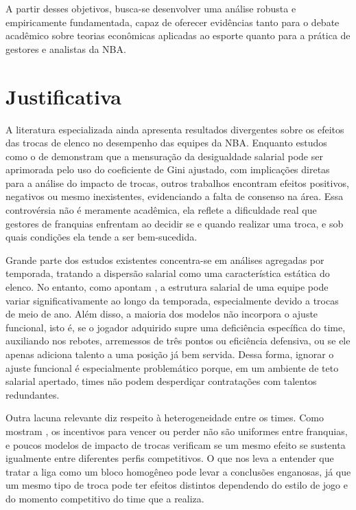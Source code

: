 A partir desses objetivos, busca-se desenvolver uma análise robusta e empiricamente fundamentada, capaz de oferecer evidências tanto para o debate acadêmico sobre teorias econômicas aplicadas ao esporte quanto para a prática de gestores e analistas da NBA.

\section{Justificativa}
A literatura especializada ainda apresenta resultados divergentes sobre os efeitos das trocas de elenco no desempenho das equipes da NBA. Enquanto estudos como o de \citet{larsen2006} demonstram que a mensuração da desigualdade salarial pode ser aprimorada pelo uso do coeficiente de Gini ajustado, com implicações diretas para a análise do impacto de trocas, outros trabalhos encontram efeitos positivos, negativos ou mesmo inexistentes, evidenciando a falta de consenso na área. Essa controvérsia não é meramente acadêmica, ela reflete a dificuldade real que gestores de franquias enfrentam ao decidir se e quando realizar uma troca, e sob quais condições ela tende a ser bem-sucedida.

Grande parte dos estudos existentes concentra-se em análises agregadas por temporada, tratando a dispersão salarial como uma característica estática do elenco. No entanto, como apontam \citet{katayama2011}, a estrutura salarial de uma equipe pode variar significativamente ao longo da temporada, especialmente devido a trocas de meio de ano. Além disso, a maioria dos modelos não incorpora o ajuste funcional, isto é, se o jogador adquirido supre uma deficiência específica do time, auxiliando nos rebotes, arremessos de três pontos ou eficiência defensiva, ou se ele apenas adiciona talento a uma posição já bem servida. Dessa forma, ignorar o ajuste funcional é especialmente problemático porque, em um ambiente de teto salarial apertado, times não podem desperdiçar contratações com talentos redundantes.

Outra lacuna relevante diz respeito à heterogeneidade entre os times. Como mostram \citet{taylor2002}, os incentivos para vencer ou perder não são uniformes entre franquias, e poucos modelos de impacto de trocas verificam se um mesmo efeito se sustenta igualmente entre diferentes perfis competitivos. O que nos leva a entender que tratar a liga como um bloco homogêneo pode levar a conclusões enganosas, já que um mesmo tipo de troca pode ter efeitos distintos dependendo do estilo de jogo e do momento competitivo do time que a realiza.

